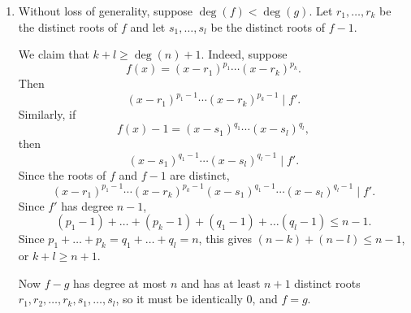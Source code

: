 \begin{enumerate}
\item Without loss of generality, suppose $\deg(f)<\deg(g)$. Let $r_1,\ldots, r_k$ be the distinct roots of $f$ and let $s_1,\ldots, s_l$ be the distinct roots of $f-1$.

We claim that $k+l\geq \deg(n)+1$. Indeed, suppose
\[f(x)=(x-r_1)^{p_1}\cdots (x-r_k)^{p_k}.\]
Then
\[(x-r_1)^{p_1-1}\cdots (x-r_k)^{p_k-1}\mid f'.\]
Similarly, if 
\[f(x)-1=(x-s_1)^{q_1}\cdots (x-s_l)^{q_l},\]
then
\[(x-s_1)^{q_1-1}\cdots (x-s_l)^{q_l-1}\mid f'.\]
Since the roots of $f$ and $f-1$ are distinct,
\[(x-r_1)^{p_1-1}\cdots (x-r_k)^{p_k-1}(x-s_1)^{q_1-1}\cdots (x-s_l)^{q_l-1}\mid f'.\]
Since $f'$ has degree $n-1$, 
\[(p_1-1)+\ldots +(p_k-1)+(q_1-1)+\ldots (q_l-1)\leq n-1.\]
Since $p_1+\ldots +p_k=q_1+\ldots +q_l=n$, this gives $(n-k)+(n-l)\leq n-1$, or $k+l\geq n+1$.

Now $f-g$ has degree at most $n$ and has at least $n+1$ distinct roots $r_1,r_2,\ldots, r_k,s_1,\ldots, s_l$, so it must be identically 0, and $f=g$.
\end{enumerate}

